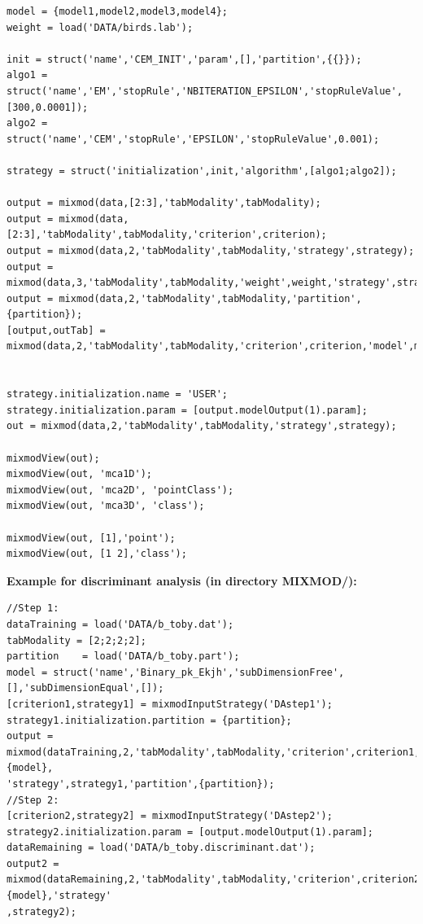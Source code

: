 \begin{itemize}
{\begin{verbatim}
model = {model1,model2,model3,model4};
weight = load('DATA/birds.lab');

init = struct('name','CEM_INIT','param',[],'partition',{{}});
algo1 = struct('name','EM','stopRule','NBITERATION_EPSILON','stopRuleValue',[300,0.0001]);
algo2 = struct('name','CEM','stopRule','EPSILON','stopRuleValue',0.001);

strategy = struct('initialization',init,'algorithm',[algo1;algo2]);

output = mixmod(data,[2:3],'tabModality',tabModality);
output = mixmod(data,[2:3],'tabModality',tabModality,'criterion',criterion);
output = mixmod(data,2,'tabModality',tabModality,'strategy',strategy);
output = mixmod(data,3,'tabModality',tabModality,'weight',weight,'strategy',strategy);
output = mixmod(data,2,'tabModality',tabModality,'partition',{partition});
[output,outTab] = mixmod(data,2,'tabModality',tabModality,'criterion',criterion,'model',model);


strategy.initialization.name = 'USER';
strategy.initialization.param = [output.modelOutput(1).param];
out = mixmod(data,2,'tabModality',tabModality,'strategy',strategy);

mixmodView(out);
mixmodView(out, 'mca1D');
mixmodView(out, 'mca2D', 'pointClass');
mixmodView(out, 'mca3D', 'class');

mixmodView(out, [1],'point');
mixmodView(out, [1 2],'class');

 \end{verbatim}

{\normalsize \textbf {Example for discriminant analysis (in directory MIXMOD/): }}\\


 \begin{verbatim}
//Step 1:
dataTraining = load('DATA/b_toby.dat');
tabModality = [2;2;2;2];
partition    = load('DATA/b_toby.part');
model = struct('name','Binary_pk_Ekjh','subDimensionFree',[],'subDimensionEqual',[]);
[criterion1,strategy1] = mixmodInputStrategy('DAstep1');
strategy1.initialization.partition = {partition};
output = mixmod(dataTraining,2,'tabModality',tabModality,'criterion',criterion1,'model',{model},
'strategy',strategy1,'partition',{partition});
//Step 2:
[criterion2,strategy2] = mixmodInputStrategy('DAstep2');
strategy2.initialization.param = [output.modelOutput(1).param];
dataRemaining = load('DATA/b_toby.discriminant.dat');
output2 = mixmod(dataRemaining,2,'tabModality',tabModality,'criterion',criterion2,'model',{model},'strategy'
,strategy2);
 \end{verbatim}}


\end{itemize}

